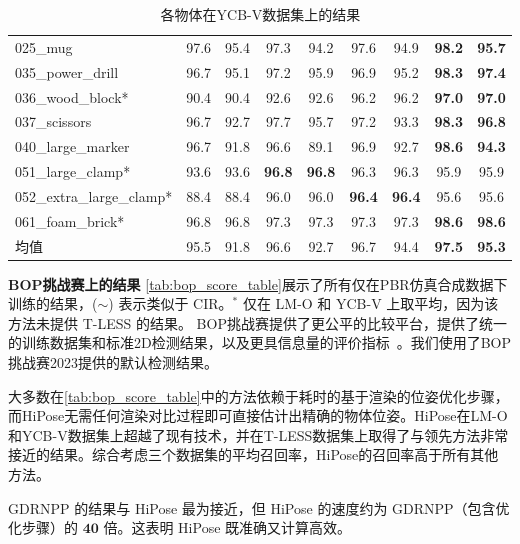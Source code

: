 \begin{table}[ht]
{\begin{tabular}{@{}l|c|c|c|c|c|c|c|c@{}}
       025\_mug               & 97.6&  95.4& 97.3& 94.2& 97.6& 94.9         & \textbf{98.2}	&\textbf{95.7}\\
       035\_power\_drill      & 96.7&  95.1& 97.2& 95.9& 96.9& 95.2           & \textbf{98.3}&	\textbf{97.4}\\
       036\_wood\_block*      & 90.4&  90.4& 92.6& 92.6& 96.2& 96.2           & \textbf{97.0}	&\textbf{97.0}\\
       037\_scissors          & 96.7&  92.7& 97.7& 95.7& 97.2& 93.3            &\textbf{98.3}&	\textbf{96.8}\\
       040\_large\_marker     & 96.7&  91.8& 96.6& 89.1& 96.9 &92.7          & \textbf{98.6}	&\textbf{94.3}\\
       051\_large\_clamp*     & 93.6&  93.6&  \textbf{96.8}& \textbf{96.8}& 96.3 &96.3          & 95.9&	95.9\\
       052\_extra\_large\_clamp* & 88.4&  88.4& 96.0& 96.0 &\textbf{96.4}& \textbf{96.4}         & 95.6&	95.6\\
       061\_foam\_brick*          & 96.8&  96.8& 97.3& 97.3& 97.3 &97.3       & \textbf{98.6}	&\textbf{98.6}\\
       \hline
       均值 & 95.5&  91.8&  96.6 &92.7& 96.7 &94.4             &\textbf{97.5} &\textbf{95.3} \\
      \bottomrule
    \end{tabular}
    }
    \caption{各物体在YCB-V数据集上的结果}
    \label{tab:ycbv_full_results_AUC}
\end{table}

\textbf{BOP挑战赛上的结果 } \autoref{tab:bop_score_table}展示了所有仅在PBR仿真合成数据下训练的结果，($\sim$) 表示类似于 CIR\cite{lipson2022coupled}。$^*$ 仅在 LM-O 和 YCB-V 上取平均，因为该方法未提供 T-LESS 的结果。 BOP挑战赛提供了更公平的比较平台，提供了统一的训练数据集和标准2D检测结果，以及更具信息量的评价指标~\cite{hodan2018bop}。我们使用了BOP挑战赛2023提供的默认检测结果。



大多数在\autoref{tab:bop_score_table}中的方法依赖于耗时的基于渲染的位姿优化步骤，而HiPose无需任何渲染对比过程即可直接估计出精确的物体位姿。HiPose在LM-O和YCB-V数据集上超越了现有技术，并在T-LESS数据集上取得了与领先方法非常接近的结果。综合考虑三个数据集的平均召回率，HiPose的召回率高于所有其他方法。

GDRNPP\cite{liu2022gdrnpp_bop} 的结果与 HiPose 最为接近，但 HiPose 的速度约为 GDRNPP（包含优化步骤）的 $\mathbf{40}$ 倍。这表明 HiPose 既准确又计算高效。

